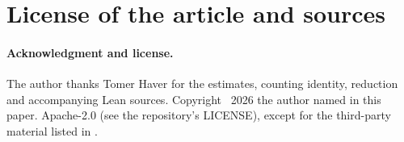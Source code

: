 \section{License of the article and sources}
\paragraph{Acknowledgment and license.}
The author thanks Tomer Haver for the estimates, counting identity,
reduction and accompanying Lean sources. Copyright \textcopyright\ 2026
the author named in this paper. Apache-2.0 (see the repository's LICENSE),
except for the third-party material listed in .
